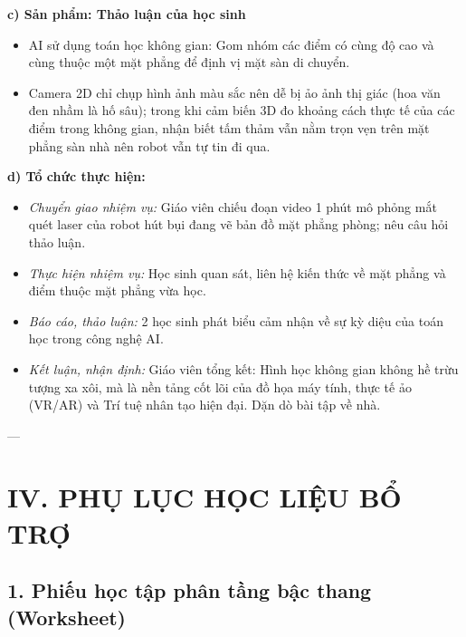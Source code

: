 \documentclass[12pt, a4paper]{article}
\begin{document}
\noindent \textbf{c) Sản phẩm: Thảo luận của học sinh}
\begin{itemize}[leftmargin=0.6cm]
    \item AI sử dụng toán học không gian: Gom nhóm các điểm có cùng độ cao và cùng thuộc một mặt phẳng để định vị mặt sàn di chuyển.
    \item Camera 2D chỉ chụp hình ảnh màu sắc nên dễ bị ảo ảnh thị giác (hoa văn đen nhầm là hố sâu); trong khi cảm biến 3D đo khoảng cách thực tế của các điểm trong không gian, nhận biết tấm thảm vẫn nằm trọn vẹn trên mặt phẳng sàn nhà nên robot vẫn tự tin đi qua.
\end{itemize}

\noindent \textbf{d) Tổ chức thực hiện:}
\begin{itemize}[leftmargin=0.8cm]
    \item \textit{Chuyển giao nhiệm vụ:} Giáo viên chiếu đoạn video 1 phút mô phỏng mắt quét laser của robot hút bụi đang vẽ bản đồ mặt phẳng phòng; nêu câu hỏi thảo luận.
    \item \textit{Thực hiện nhiệm vụ:} Học sinh quan sát, liên hệ kiến thức về mặt phẳng và điểm thuộc mặt phẳng vừa học.
    \item \textit{Báo cáo, thảo luận:} 2 học sinh phát biểu cảm nhận về sự kỳ diệu của toán học trong công nghệ AI.
    \item \textit{Kết luận, nhận định:} Giáo viên tổng kết: Hình học không gian không hề trừu tượng xa xôi, mà là nền tảng cốt lõi của đồ họa máy tính, thực tế ảo (VR/AR) và Trí tuệ nhân tạo hiện đại. Dặn dò bài tập về nhà.
\end{itemize}

---

\section*{IV. PHỤ LỤC HỌC LIỆU BỔ TRỢ}

\subsection*{1. Phiếu học tập phân tầng bậc thang (Worksheet)}
\end{document}
